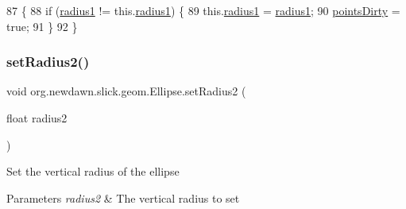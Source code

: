 \begin{DoxyCode}
87                                           \{
88         \textcolor{keywordflow}{if} (\mbox{\hyperlink{classorg_1_1newdawn_1_1slick_1_1geom_1_1_ellipse_a26f6d13c3b22a475bc1caf33f84a24b9}{radius1}} != this.\mbox{\hyperlink{classorg_1_1newdawn_1_1slick_1_1geom_1_1_ellipse_a26f6d13c3b22a475bc1caf33f84a24b9}{radius1}}) \{
89             this.\mbox{\hyperlink{classorg_1_1newdawn_1_1slick_1_1geom_1_1_ellipse_a26f6d13c3b22a475bc1caf33f84a24b9}{radius1}} = \mbox{\hyperlink{classorg_1_1newdawn_1_1slick_1_1geom_1_1_ellipse_a26f6d13c3b22a475bc1caf33f84a24b9}{radius1}};
90             \mbox{\hyperlink{classorg_1_1newdawn_1_1slick_1_1geom_1_1_shape_a61fe1954d2fdefc72c34b284f4fcfdb4}{pointsDirty}} = \textcolor{keyword}{true};
91         \}
92     \}
\end{DoxyCode}
\mbox{\label{classorg_1_1newdawn_1_1slick_1_1geom_1_1_ellipse_ac172de7810cab47810a23c6661515e89}} 
\subsubsection{\texorpdfstring{set\+Radius2()}{setRadius2()}}
{\footnotesize\ttfamily void org.\+newdawn.\+slick.\+geom.\+Ellipse.\+set\+Radius2 (\begin{DoxyParamCaption}\item[{float}]{radius2 }\end{DoxyParamCaption})\hspace{0.3cm}{\ttfamily [inline]}}

Set the vertical radius of the ellipse


\begin{DoxyParams}{Parameters}
{\em radius2} & The vertical radius to set \\
\hline
\end{DoxyParams}

